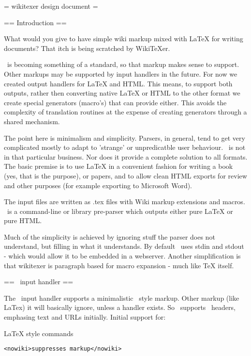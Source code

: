 = wikitexer design document =

== Introduction ==


What would you give to have simple wiki markup mixed with LaTeX for
writing documents? That itch is being scratched by WikiTeXer.

\mediawiki\ is becoming something of a standard, so that markup makes
sense to support. Other markups may be supported by input handlers in
the future. For now we created output handlers for LaTeX and HTML.
This means, to support both outputs, rather then converting native
LaTeX or HTML to the other format we create special generators
(macro's) that can provide either. This avoids the complexity of
translation routines at the expense of creating generators through a
shared mechanism.

The point here is minimalism and simplicity. Parsers, in general, tend
to get very complicated mostly to adapt to 'strange' or unpredicatble
user behaviour. \wikitexer\ is not in that particular business. Nor
does it provide a complete solution to all formats. The basic premise
is to use LaTeX in a convenient fashion for writing a book (yes, that
is the purpose), or papers, and to allow clean HTML exports for review
and other purposes (for example exporting to Microsoft Word).

The input files are written as .tex files with Wiki markup extensions
and macros. \wikitexer\ is a command-line or library pre-parser which
outputs either pure LaTeX or pure HTML.

Much of the simplicity is achieved by ignoring stuff the parser does
not understand, but filling in what it understands. By default
\wikitexer\ uses stdin and stdout - which would allow it to be
embedded in a webserver. Another simplification is that wikitexer is 
paragraph based for macro expansion - much like TeX itself.


== \mediawiki\ input handler ==

The \mediawiki\ input handler supports a minimalistic \mediawiki\ style
markup. Other markup (like LaTex) it will basically ignore, unless a
handler exists. So \wikitexer\ supports \mediawiki\ headers, emphasing text
and URLs initially. Initial support for:

LaTeX style commands

\begin{verbatim}
<nowiki>suppresses markup</nowiki>
\end{verbatim}

